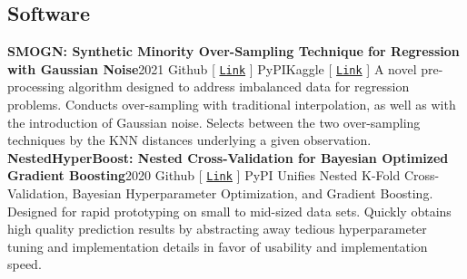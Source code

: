 \documentclass{article}
\begin{document}
\begin{bgbox}[
        height = \paperheight,
        width = 0.69\textwidth,
        colback = white
    ]
{            \section*{Software}
            \textbf{SMOGN: Synthetic Minority Over-Sampling Technique for Regression with Gaussian Noise}\hfill{2021}\newline
            \faGithub\space Github [ \href{https://github.com/nickkunz/smogn}{\texttt{Link}} ] \space\faPython\space PyPI\space\faUsers\space Kaggle [ \href{https://www.kaggle.com/aleksandradeis/regression-addressing-extreme-rare-cases}{\texttt{Link}} ]\newline\newline
            A novel pre-processing algorithm designed to address imbalanced data for regression problems. Conducts over-sampling with traditional interpolation, as well as with the introduction of Gaussian noise. Selects between the two over-sampling techniques by the KNN distances underlying a given observation.\newline\newline
            \textbf{NestedHyperBoost: Nested Cross-Validation for Bayesian Optimized Gradient Boosting}\hfill{2020}\newline
            \faGithub\space Github [ \href{https://github.com/nickkunz/nestedhyperboost}{\texttt{Link}} ] \space\faPython\space PyPI\newline\newline
            Unifies Nested K-Fold Cross-Validation, Bayesian Hyperparameter Optimization, and Gradient Boosting. Designed for rapid prototyping on small to mid-sized data sets. Quickly obtains high quality prediction results by abstracting away tedious hyperparameter tuning and implementation details in favor of usability and implementation speed.
}
\end{bgbox}
\end{document}
